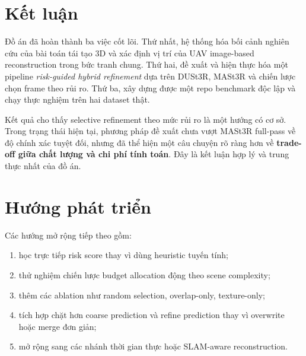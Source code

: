 \documentclass[../DoAn.tex]{subfiles}
\begin{document}
\section{Kết luận}

Đồ án đã hoàn thành ba việc cốt lõi. Thứ nhất, hệ thống hóa bối cảnh nghiên cứu của bài toán tái tạo 3D và xác định vị trí của UAV image-based reconstruction trong bức tranh chung. Thứ hai, đề xuất và hiện thực hóa một pipeline \textit{risk-guided hybrid refinement} dựa trên DUSt3R, MASt3R và chiến lược chọn frame theo rủi ro. Thứ ba, xây dựng được một repo benchmark độc lập và chạy thực nghiệm trên hai dataset thật.

Kết quả cho thấy selective refinement theo mức rủi ro là một hướng có cơ sở. Trong trạng thái hiện tại, phương pháp đề xuất chưa vượt MASt3R full-pass về độ chính xác tuyệt đối, nhưng đã thể hiện một câu chuyện rõ ràng hơn về \textbf{trade-off giữa chất lượng và chi phí tính toán}. Đây là kết luận hợp lý và trung thực nhất của đồ án.

\section{Hướng phát triển}

Các hướng mở rộng tiếp theo gồm:
\begin{enumerate}[leftmargin=1.5em]
  \item học trực tiếp risk score thay vì dùng heuristic tuyến tính;
  \item thử nghiệm chiến lược budget allocation động theo scene complexity;
  \item thêm các ablation như random selection, overlap-only, texture-only;
  \item tích hợp chặt hơn coarse prediction và refine prediction thay vì overwrite hoặc merge đơn giản;
  \item mở rộng sang các nhánh thời gian thực hoặc SLAM-aware reconstruction.
\end{enumerate}
\end{document}
